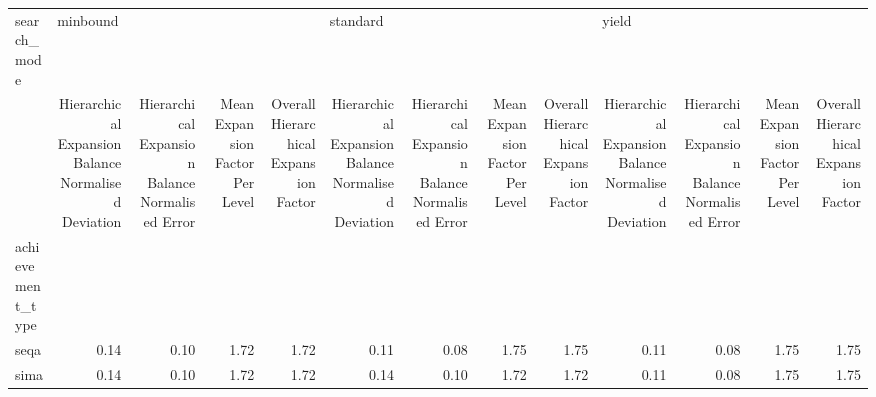 \begin{tabular}{lrrrrrrrrrrrr}
\toprule
search\_mode & \multicolumn{4}{l}{minbound} & \multicolumn{4}{l}{standard} & \multicolumn{4}{l}{yield} \\
{} & Hierarchical Expansion Balance Normalised Deviation & Hierarchical Expansion Balance Normalised Error & Mean Expansion Factor Per Level & Overall Hierarchical Expansion Factor & Hierarchical Expansion Balance Normalised Deviation & Hierarchical Expansion Balance Normalised Error & Mean Expansion Factor Per Level & Overall Hierarchical Expansion Factor & Hierarchical Expansion Balance Normalised Deviation & Hierarchical Expansion Balance Normalised Error & Mean Expansion Factor Per Level & Overall Hierarchical Expansion Factor \\
achievement\_type &                                                     &                                                 &                                 &                                       &                                                     &                                                 &                                 &                                       &                                                     &                                                 &                                 &                                       \\
\midrule
seqa             &                                               0.14 &                                            0.10 &                            1.72 &                                  1.72 &                                               0.11 &                                            0.08 &                            1.75 &                                  1.75 &                                               0.11 &                                            0.08 &                            1.75 &                                  1.75 \\
sima             &                                               0.14 &                                            0.10 &                            1.72 &                                  1.72 &                                               0.14 &                                            0.10 &                            1.72 &                                  1.72 &                                               0.11 &                                            0.08 &                            1.75 &                                  1.75 \\
\bottomrule
\end{tabular}
